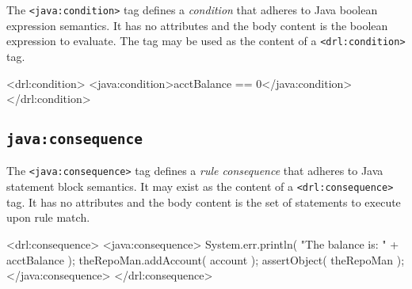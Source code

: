 The \verb|<java:condition>| tag defines a \emph{condition} that
adheres to Java boolean expression semantics.  It has no
attributes and the body content is the boolean expression to
evaluate.  The tag may be used as the content of a \verb|<drl:condition>|
tag.

\begin{codelisting}
\textcolor{light}{<drl:condition>}
  <java:condition>acctBalance == 0</java:condition>
\textcolor{light}{</drl:condition>}
\end{codelisting}

\subsection{\texttt{java:consequence}}

The \verb|<java:consequence>| tag defines a \emph{rule consequence}
that adheres to Java statement block semantics.  It may exist as the
content of a \verb|<drl:consequence>| tag.  It has no
attributes and the body content is the set of statements
to execute upon rule match.


\begin{codelisting}
\textcolor{light}{<drl:consequence>}
  <java:consequence>
    System.err.println( "The balance is: " + acctBalance );
    theRepoMan.addAccount( account );
    assertObject( theRepoMan );
  </java:consequence>
\textcolor{light}{</drl:consequence>}
\end{codelisting}


